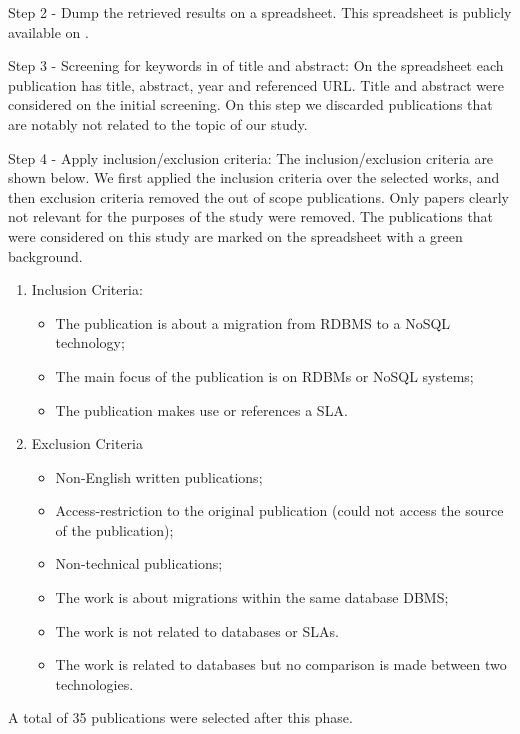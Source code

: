 \documentclass[a4paper]{IEEEtran}
\begin{document}
Step 2 - Dump the retrieved results on a spreadsheet. This spreadsheet is publicly available on \cite{systematicMappingSpreadsheet}.

Step 3 - Screening for keywords in of title and abstract: On the spreadsheet each publication has title, abstract, year and referenced URL. Title and abstract were considered on the initial screening. On this step we discarded publications that are notably not related to the topic of our study. %

Step 4 - Apply inclusion/exclusion criteria: The inclusion/exclusion criteria are shown below. We first applied the inclusion criteria over the selected works, and then exclusion criteria removed the out of scope publications. Only papers clearly not relevant for the purposes of the study were removed. The publications that were considered on this study are marked on the spreadsheet with a green background.

\begin{enumerate}
    \item Inclusion Criteria: 
    \begin{itemize}
      \item The publication is about a migration from RDBMS to a NoSQL technology;
      \item The main focus of the publication is on RDBMs or NoSQL systems;
      \item The publication makes use or references a SLA.
    \end{itemize}
    \item Exclusion Criteria
	\begin{itemize}
    \item Non-English written publications;
		\item Access-restriction to the original publication (could not access the source of the publication);
		\item Non-technical publications;
    \item The work is about migrations within the same database DBMS;
    \item The work is not related to databases or SLAs.
    \item The work is related to databases but no comparison is made between two technologies.
    \end{itemize}
    
\end{enumerate}
A total of 35 publications were selected after this phase. 
\end{document}

